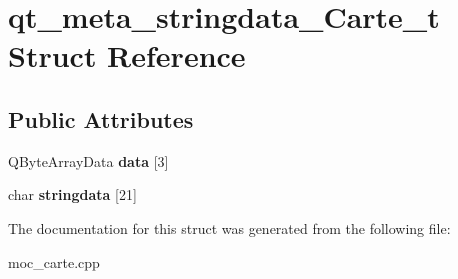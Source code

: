 \hypertarget{structqt__meta__stringdata__Carte__t}{\section{qt\+\_\+meta\+\_\+stringdata\+\_\+\+Carte\+\_\+t Struct Reference}
\label{structqt__meta__stringdata__Carte__t}
}
\subsection*{Public Attributes}
\begin{DoxyCompactItemize}
\item 
\hypertarget{structqt__meta__stringdata__Carte__t_af14d5110e51b96e8db238f59dbe42704}{Q\+Byte\+Array\+Data {\bfseries data} \mbox{[}3\mbox{]}}\label{structqt__meta__stringdata__Carte__t_af14d5110e51b96e8db238f59dbe42704}

\item 
\hypertarget{structqt__meta__stringdata__Carte__t_ab444d03dcb9c21da9cb263531278c892}{char {\bfseries stringdata} \mbox{[}21\mbox{]}}\label{structqt__meta__stringdata__Carte__t_ab444d03dcb9c21da9cb263531278c892}

\end{DoxyCompactItemize}


The documentation for this struct was generated from the following file\+:\begin{DoxyCompactItemize}
\item 
moc\+\_\+carte.\+cpp\end{DoxyCompactItemize}
